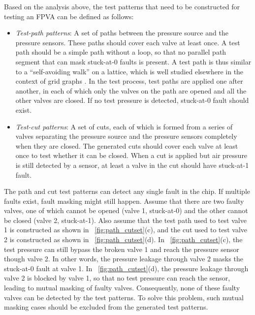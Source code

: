\documentclass[journal,twoside]{IEEEtran}
\begin{document}
Based on the analysis above, the test patterns that need to be constructed for
testing an FPVA can be defined as follows:

\begin{itemize} 
 
  \item\textit{Test-path patterns}: A set of paths between the pressure source
    and the pressure sensors. These paths should cover each valve at least once. 
    A test path should be a simple
path without a loop, so that no parallel path segment
that can mask stuck-at-0 faults is present. A test path is thus
similar to a ``self-avoiding walk'' on a lattice, which is well studied
elsewhere in the context of grid graphs \cite{walk1996}.
    In the test
    process, test paths are applied one after another, in each of which only
    the valves on the path are opened and all the other valves are closed.
    If no test pressure is detected, 
    stuck-at-0 fault should exist.
 
\item\textit{Test-cut patterns}:  A set of cuts, each of which is formed from a
  series of valves 
  separating the pressure source and the pressure sensors 
  completely when they are closed. The generated cuts should cover each valve at least once to test
  whether it can be closed. When a cut is applied but air pressure is still
  detected by a sensor, at least a valve in the cut should have stuck-at-1 fault. 
\end{itemize}

The path and cut test patterns can detect any single fault in the chip. 
If multiple faults exist, fault masking might still happen.
Assume that there are two faulty valves, one of which cannot be opened (valve
1, stuck-at-0) and the other cannot be closed (valve 2, stuck-at-1).  Also
assume that the test path used to test valve 1 is constructed as shown in  
\figname~\ref{fig:path_cutset}(c), and  the cut used to test valve 2 is
constructed as shown  in \figname~\ref{fig:path_cutset}(d). In 
\figname~\ref{fig:path_cutset}(c), the test pressure can still bypass the
broken valve 1 and reach the pressure sensor though valve 2. In other words,
the pressure leakage through valve 2 masks the stuck-at-0 fault at valve 1. 
In \figname~\ref{fig:path_cutset}(d), the
pressure leakage through valve 2 is blocked by valve 1, 
so that no test pressure can reach the sensor,
leading to mutual masking of faulty valves.
Consequently, none of these faulty valves can be detected by the test patterns. 
To solve this problem, such mutual masking
cases should be excluded from the generated test patterns. 
\end{document}
